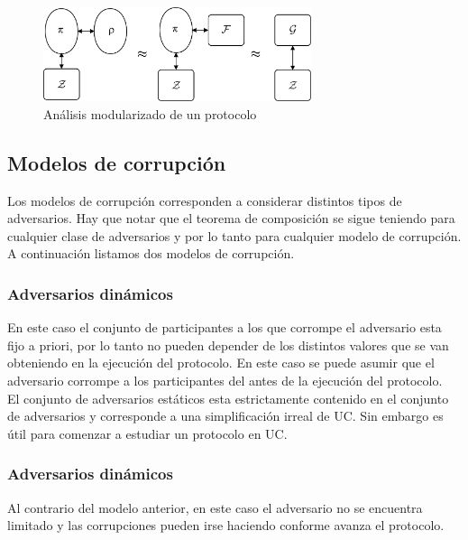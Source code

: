 \begin{figure}[hp]
    \centering
    \includegraphics[width=0.7\textwidth]{figs/dolev_yao}
    \caption{Análisis modularizado de un protocolo}
    \label{fig:proceder_uc}
\end{figure}

\subsection{Modelos de corrupción}

Los modelos de corrupción corresponden a considerar distintos tipos de adversarios. Hay que notar
que el teorema de composición se sigue teniendo para cualquier clase de adversarios y por lo tanto
para cualquier modelo de corrupción.
A continuación listamos dos modelos de corrupción.

\subsubsection{Adversarios dinámicos}
En este caso el conjunto de participantes a los que corrompe el adversario esta fijo a priori, por
lo tanto no pueden depender de los distintos valores que se van obteniendo en la ejecución del
protocolo. En este caso se puede asumir que el adversario corrompe a los participantes del
antes de la ejecución del protocolo.\\
El conjunto de adversarios estáticos esta estrictamente contenido en el conjunto de adversarios
y corresponde a una simplificación irreal de UC. Sin embargo es útil para comenzar a estudiar
un protocolo en UC.

\subsubsection{Adversarios dinámicos}
Al contrario del modelo anterior, en este caso el adversario no se encuentra limitado y las corrupciones
pueden irse haciendo conforme avanza el protocolo.



